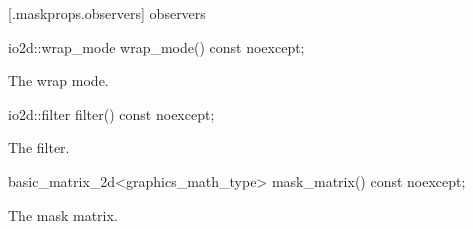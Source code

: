 [\iotwod.maskprops.observers] { observers}

%
\begin{itemdecl}
io2d::wrap_mode wrap_mode() const noexcept;
\end{itemdecl}
\begin{itemdescr}
\pnum
\returns
The wrap mode.
\end{itemdescr}

%
\begin{itemdecl}
io2d::filter filter() const noexcept;
\end{itemdecl}
\begin{itemdescr}
\pnum
\returns
The filter.
\end{itemdescr}

%
\begin{itemdecl}
basic_matrix_2d<graphics_math_type> mask_matrix() const noexcept;
\end{itemdecl}
\begin{itemdescr}
\pnum
\returns
The mask matrix.
\end{itemdescr}
